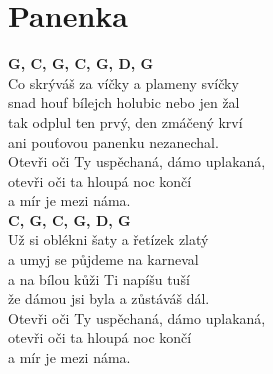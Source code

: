 \section{Panenka}
\onehalfspacing

\textbf{G, C, G, C, G, D, G}\\
Co skrýváš za víčky a plameny svíčky\\
snad houf bílejch holubic nebo jen žal\\
tak odplul ten prvý, den zmáčený krví\\
ani pouťovou panenku nezanechal.\\

Otevři oči Ty uspěchaná, dámo uplakaná,\\
otevři oči ta hloupá noc končí\\
a mír je mezi náma.\\

\textbf{C, G, C, G, D, G}\\

Už si oblékni šaty a řetízek zlatý\\
a umyj se půjdeme na karneval\\
a na bílou kůži Ti napíšu tuší\\
že dámou jsi byla a zůstáváš dál.\\

Otevři oči Ty uspěchaná, dámo uplakaná,\\
otevři oči ta hloupá noc končí\\
a mír je mezi náma.\\

